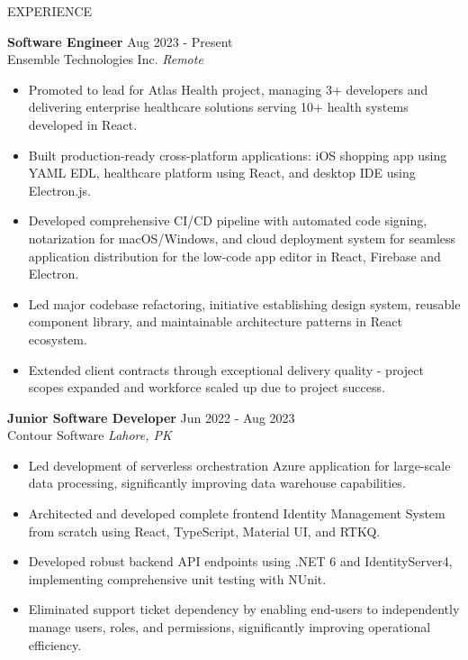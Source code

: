 \documentclass{resume} %
\begin{document}
\begin{rSection}{EXPERIENCE}

\textbf{Software Engineer} \hfill Aug 2023 - Present\\
Ensemble Technologies Inc. \hfill \textit{Remote}
 \begin{itemize}
    \itemsep -3pt {} 
     \item Promoted to lead for Atlas Health project, managing 3+ developers and delivering enterprise healthcare solutions serving 10+ health systems developed in React.
     \item Built production-ready cross-platform applications: iOS shopping app using YAML EDL, healthcare platform using React, and desktop IDE using Electron.js.
     \item Developed comprehensive CI/CD pipeline with automated code signing, notarization for macOS/Windows, and cloud deployment system for seamless application distribution for the low-code app editor in React, Firebase and Electron.
     \item Led major codebase refactoring, initiative establishing design system, reusable component library, and maintainable architecture patterns in React ecosystem.
     \item Extended client contracts through exceptional delivery quality - project scopes expanded and workforce scaled up due to project success.
 \end{itemize}
 
\textbf{Junior Software Developer} \hfill Jun 2022 - Aug 2023\\
Contour Software \hfill \textit{Lahore, PK}
 \begin{itemize}
    \itemsep -3pt {} 
     \item Led development of serverless orchestration Azure application for large-scale data processing, significantly improving data warehouse capabilities.
     \item Architected and developed complete frontend Identity Management System from scratch using React, TypeScript, Material UI, and RTKQ.
     \item Developed robust backend API endpoints using .NET 6 and IdentityServer4, implementing comprehensive unit testing with NUnit.
     \item Eliminated support ticket dependency by enabling end-users to independently manage users, roles, and permissions, significantly improving operational efficiency.
 \end{itemize}

\end{rSection} 
\end{document}
